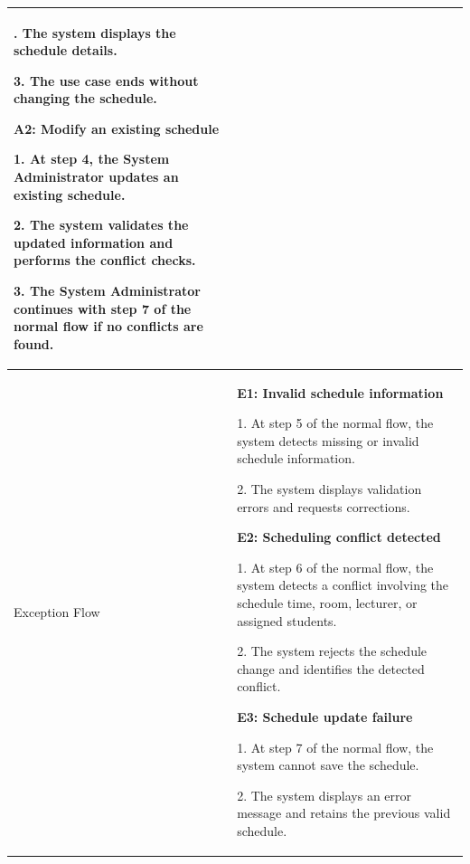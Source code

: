 \begin{longtable}{|>{\bfseries\raggedright\arraybackslash}p{}|>{\raggedright\arraybackslash}p{}|}
2. The system displays the schedule details. \par
3. The use case ends without changing the schedule. \par\vspace{4pt}
\textbf{A2: Modify an existing schedule} \par
1. At step 4, the System Administrator updates an existing schedule. \par
2. The system validates the updated information and performs the conflict checks. \par
3. The System Administrator continues with step 7 of the normal flow if no conflicts are found. \\ \hline
Exception Flow &
\textbf{E1: Invalid schedule information} \par
1. At step 5 of the normal flow, the system detects missing or invalid schedule information. \par
2. The system displays validation errors and requests corrections. \par\vspace{4pt}
\textbf{E2: Scheduling conflict detected} \par
1. At step 6 of the normal flow, the system detects a conflict involving the schedule time, room, lecturer, or assigned students. \par
2. The system rejects the schedule change and identifies the detected conflict. \par\vspace{4pt}
\textbf{E3: Schedule update failure} \par
1. At step 7 of the normal flow, the system cannot save the schedule. \par
2. The system displays an error message and retains the previous valid schedule. \\ \hline
\end{longtable}


